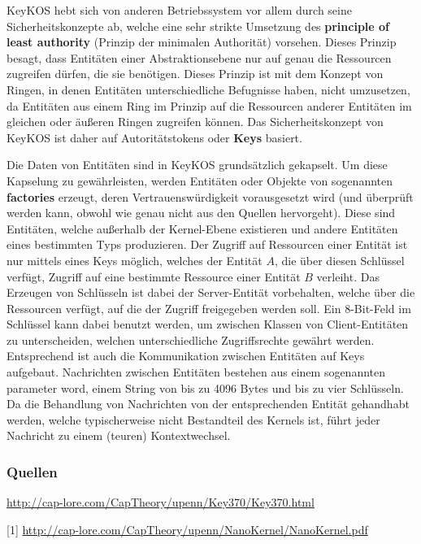 \documentclass[numbers=noendperiod]{scrartcl}
\begin{document}
KeyKOS hebt sich von anderen Betriebssystem vor allem durch seine Sicherheitskonzepte ab, welche eine sehr strikte Umsetzung des \textbf{principle of least authority} (Prinzip der minimalen Authorität) vorsehen. Dieses Prinzip besagt, dass Entitäten einer Abstraktionsebene nur auf genau die Ressourcen zugreifen dürfen, die sie benötigen. Dieses Prinzip ist mit dem Konzept von Ringen, in denen Entitäten unterschiedliche Befugnisse haben, nicht umzusetzen, da Entitäten aus einem Ring im Prinzip auf die Ressourcen anderer Entitäten im gleichen oder äußeren Ringen zugreifen können. Das Sicherheitskonzept von KeyKOS ist daher auf Autoritätstokens oder \textbf{Keys} basiert.

Die Daten von Entitäten sind in KeyKOS grundsätzlich gekapselt. Um diese Kapselung zu gewährleisten, werden Entitäten oder Objekte von sogenannten \textbf{factories} erzeugt, deren Vertrauenswürdigkeit vorausgesetzt wird (und überprüft werden kann, obwohl wie genau nicht aus den Quellen hervorgeht). Diese sind Entitäten, welche außerhalb der Kernel-Ebene existieren und andere Entitäten eines bestimmten Typs produzieren. Der Zugriff auf Ressourcen einer Entität ist nur mittels eines Keys möglich, welches der Entität $A$, die über diesen Schlüssel verfügt, Zugriff auf eine bestimmte Ressource einer Entität $B$ verleiht. Das Erzeugen von Schlüsseln ist dabei der Server-Entität vorbehalten, welche über die Ressourcen verfügt, auf die der Zugriff freigegeben werden soll. Ein 8-Bit-Feld im Schlüssel kann dabei benutzt werden, um zwischen Klassen von Client-Entitäten zu unterscheiden, welchen unterschiedliche Zugriffsrechte gewährt werden.\\

Entsprechend ist auch die Kommunikation zwischen Entitäten auf Keys aufgebaut. Nachrichten zwischen Entitäten bestehen aus einem sogenannten parameter word, einem String von bis zu 4096 Bytes und bis zu vier Schlüsseln.
Da die Behandlung von Nachrichten von der entsprechenden Entität gehandhabt werden, welche typischerweise nicht Bestandteil des Kernels ist, führt jeder Nachricht zu einem (teuren) Kontextwechsel.

\subsubsection*{Quellen}

\url{http://cap-lore.com/CapTheory/upenn/Key370/Key370.html}

[1] \url{http://cap-lore.com/CapTheory/upenn/NanoKernel/NanoKernel.pdf}
\end{document}
